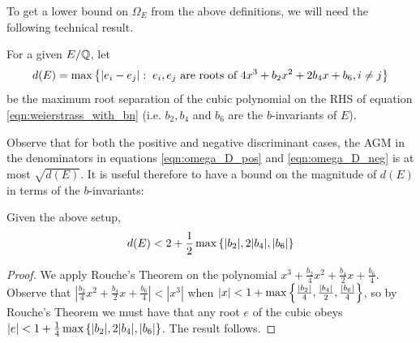 To get a lower bound on $\Omega_E$ from the above definitions, we will need the following technical result.
\begin{definition}
For a given $E/\mathbb{Q}$, let 
\begin{equation}
d(E) = \max\left\{|e_i - e_j|: \; e_i,e_j \text{ are roots of }4x^3 + b_2  x^2 + 2 b_4 x + b_6, i\ne j\right\}
\end{equation}
be the maximum root separation of the cubic polynomial on the RHS of equation \ref{eqn:weierstrass_with_bn}
(i.e. $b_2, b_4$ and $b_6$ are the $b$-invariants of $E$).
\end{definition}
Observe that for both the positive and negative discriminant cases, the AGM in the denominators in equations \ref{eqn:omega_D_pos} and \ref{eqn:omega_D_neg} is at most $\sqrt{d(E)}$. It is useful therefore to have a bound on the magnitude of $d(E)$ in terms of the $b$-invariants:
\begin{lemma}\label{lem:root_separation_bound}
Given the above setup,
\begin{equation}
d(E) < 2+\frac{1}{2}\max\left\{|b_2|,2|b_4|,|b_6|\right\}
\end{equation}
\end{lemma}
\begin{proof}
We apply Rouche's Theorem on the polynomial $x^3 + \frac{b_2}{4} x^2 + \frac{b_4}{2} x + \frac{b_6}{4}$. Observe that $|\frac{b_2}{4} x^2 + \frac{b_4}{2} x + \frac{b_6}{4}| < |x^3|$ when $|x| < 1+\max\left\{\frac{|b_2|}{4},\frac{|b_4|}{2},\frac{|b_6|}{4}\right\}$, so by Rouche's Theorem we must have that any root $e$ of the cubic obeys $|e| <  1+\frac{1}{4}\max\left\{|b_2|,2|b_4|,|b_6|\right\}$. The result follows.
\end{proof}

